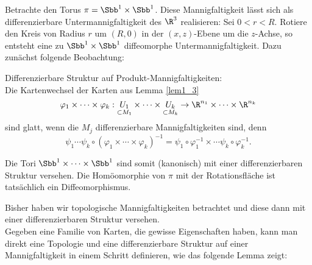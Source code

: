 \begin{exmp*}
	Betrachte den Torus $ \pi = \Sbb^1 \times \Sbb^1 $. Diese Mannigfaltigkeit lässt sich als differenzierbare Untermannigfaltigkeit des $\R^3$ realisieren: Sei $ 0 < r < R $. Rotiere den Kreis von Radius $r$ um $ (R,0) $ in der $(x,z)$-Ebene um die $z$-Achse, so entsteht eine zu $ \Sbb^1 \times \Sbb^1 $ diffeomorphe Untermannigfaltigkeit. Dazu zunächst folgende Beobachtung:
	\addtocounter{thm}{1}
	\begin{rem}
		Differenzierbare Struktur auf Produkt-Mannigfaltigkeiten:\\
		Die Kartenwechsel der Karten aus Lemma \ref{lem1_3} 
		\[ \varphi_1 \times \dotsm \times \varphi_k: \underset{\subset M_1}{U_1} \times \dotsm \times \underset{\subset M_k}{U_k} \to \R^{n_1} \times \dotsm \times \R^{n_k} \]
		sind glatt, wenn die $M_j$ differenzierbare Mannigfaltigkeiten sind, denn 
		\[ \psi_1 \dotsm \psi_k \circ (\varphi_1 \times \dotsm \times \varphi_k)^{-1} = \psi_1 \circ \varphi_1^{-1} \times \dotsm \psi_k \circ \varphi_k^{-1}. \]
	\end{rem}
	Die Tori $ \Sbb^1 \times \dotsm \times \Sbb^1 $ sind somit (kanonisch) mit einer differenzierbaren Struktur versehen. Die Homöomorphie von $\pi$ mit der Rotationsfläche ist tatsächlich ein Diffeomorphismus.
\end{exmp*}

\begin{rem*}
	Bisher haben wir topologische Mannigfaltigkeiten betrachtet und diese dann mit einer differenzierbaren Struktur versehen.\\
	Gegeben eine Familie von Karten, die gewisse Eigenschaften haben, kann man direkt eine Topologie und eine differenzierbare Struktur auf einer Mannigfaltigkeit in einem Schritt definieren, wie das folgende Lemma zeigt:
\end{rem*}

